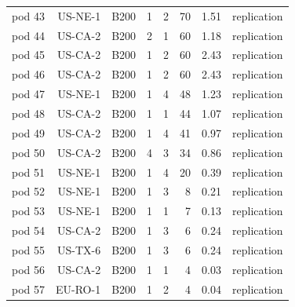 \begin{longtable}{lrrrrrrr}
pod 43 & US-NE-1 & B200 & 1 & 2 & 70 & 1.51 & replication \\
pod 44 & US-CA-2 & B200 & 2 & 1 & 60 & 1.18 & replication \\
pod 45 & US-CA-2 & B200 & 1 & 2 & 60 & 2.43 & replication \\
pod 46 & US-CA-2 & B200 & 1 & 2 & 60 & 2.43 & replication \\
pod 47 & US-NE-1 & B200 & 1 & 4 & 48 & 1.23 & replication \\
pod 48 & US-CA-2 & B200 & 1 & 1 & 44 & 1.07 & replication \\
pod 49 & US-CA-2 & B200 & 1 & 4 & 41 & 0.97 & replication \\
pod 50 & US-CA-2 & B200 & 4 & 3 & 34 & 0.86 & replication \\
pod 51 & US-NE-1 & B200 & 1 & 4 & 20 & 0.39 & replication \\
pod 52 & US-NE-1 & B200 & 1 & 3 & 8 & 0.21 & replication \\
pod 53 & US-NE-1 & B200 & 1 & 1 & 7 & 0.13 & replication \\
pod 54 & US-CA-2 & B200 & 1 & 3 & 6 & 0.24 & replication \\
pod 55 & US-TX-6 & B200 & 1 & 3 & 6 & 0.24 & replication \\
pod 56 & US-CA-2 & B200 & 1 & 1 & 4 & 0.03 & replication \\
pod 57 & EU-RO-1 & B200 & 1 & 2 & 4 & 0.04 & replication \\
\end{longtable}
\endgroup
